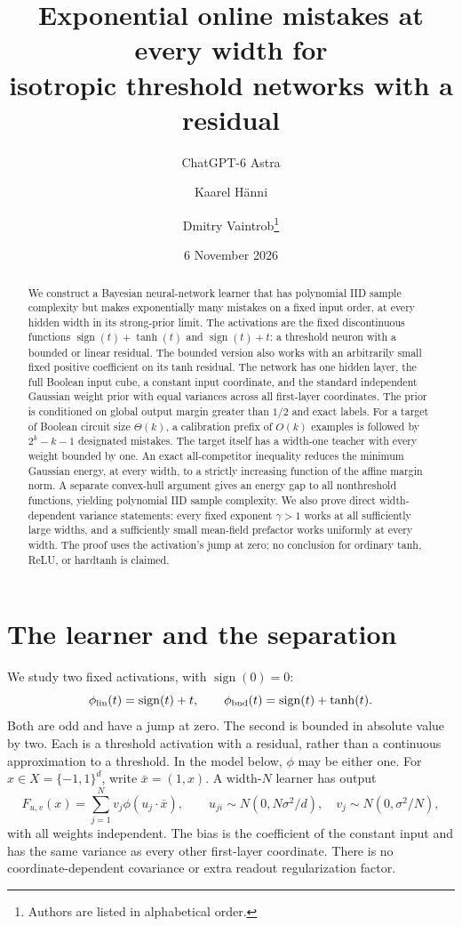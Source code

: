 \documentclass[11pt]{article}
\title{Exponential online mistakes at every width for\protect\\isotropic threshold networks with a residual}
\author{ChatGPT-6 Astra \and Kaarel H\"anni \and Dmitry Vaintrob\thanks{Authors are listed in alphabetical order.}}
\date{6 November 2026}
\newcommand{\sgn}{\operatorname{sign}}
\begin{document}
\maketitle

\begin{abstract}
We construct a Bayesian neural-network learner that has polynomial IID
sample complexity but makes exponentially many mistakes on a fixed
input order, at every hidden width in its strong-prior limit.
The activations are the fixed discontinuous functions
$\sgn(t)+\tanh(t)$ and $\sgn(t)+t$: a threshold neuron with a bounded
or linear residual. The bounded version also works with an arbitrarily
small fixed positive coefficient on its tanh residual.
The network has one hidden layer, the full Boolean input cube, a constant
input coordinate, and the standard independent Gaussian weight prior
with equal variances across all first-layer coordinates. The prior is
conditioned on global output margin greater than $1/2$ and exact labels.
For a target of Boolean circuit size $\Theta(k)$, a calibration prefix of
$O(k)$ examples is followed by $2^k-k-1$ designated mistakes. The target
itself has a width-one teacher with every weight bounded by one.
An exact all-competitor inequality reduces the minimum Gaussian energy,
at every width, to a strictly increasing function of the affine margin
norm. A separate convex-hull argument gives an energy gap to all
nonthreshold functions, yielding polynomial IID sample complexity.
We also prove direct width-dependent variance statements: every fixed
exponent $\gamma>1$ works at all sufficiently large widths, and a
sufficiently small mean-field prefactor works uniformly at every width.
The proof uses the activation's jump at zero; no conclusion
for ordinary tanh, ReLU, or hardtanh is claimed.
\end{abstract}

\section{The learner and the separation}

We study two fixed activations, with $\sgn(0)=0$:
\[
 \phi_{\rm lin}(t)=\sgn(t)+t,\qquad
 \phi_{\rm bnd}(t)=\sgn(t)+\tanh(t).
\]
Both are odd and have a jump at zero. The second is bounded in absolute
value by two. Each is a threshold activation with a residual, rather
than a continuous approximation to a threshold. In the model below,
$\phi$ may be either one.
For $x\in X=\{-1,1\}^d$, write $\bar x=(1,x)$.
A width-$N$ learner has output
\begin{equation}\label{eq:model}
 F_{u,v}(x)=\sum_{j=1}^N v_j\phi(u_j\cdot\bar x),
 \qquad
 u_{ji}\sim N(0,N\sigma^2/d),\quad
 v_j\sim N(0,\sigma^2/N),
\end{equation}
with all weights independent. The bias is the coefficient of the
constant input and has the same variance as every other first-layer
coordinate. There is no coordinate-dependent covariance or extra
readout regularization factor.
\end{document}
